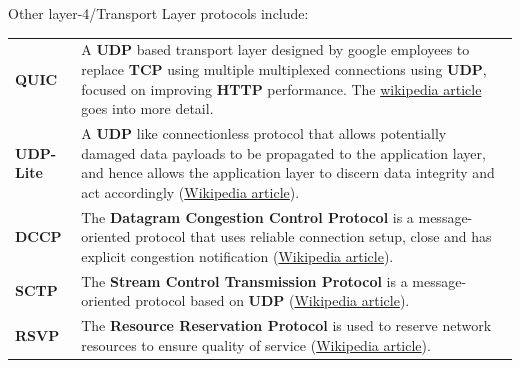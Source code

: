Other layer-4/Transport Layer protocols include:
\begin{center}
    \begin{tabular}{l p{}}
        \textbf{QUIC}     & A \textbf{UDP} based transport layer designed by google employees to replace \textbf{TCP} using multiple multiplexed connections using \textbf{UDP}, focused on improving \textbf{HTTP} performance. The \href{https://en.wikipedia.org/wiki/QUIC}{wikipedia article} goes into more detail.  \\
        \textbf{UDP-Lite} & A \textbf{UDP} like connectionless protocol that allows potentially damaged data payloads to be propagated to the application layer, and hence allows the application layer to discern data integrity and act accordingly (\href{https://en.wikipedia.org/wiki/UDP-Lite}{Wikipedia article}). \\
        \textbf{DCCP}     & The \textbf{Datagram Congestion Control Protocol} is a message-oriented protocol that uses reliable connection setup, close and has explicit congestion notification (\href{https://en.wikipedia.org/wiki/Datagram_Congestion_Control_Protocol}{Wikipedia article}).                          \\
        \textbf{SCTP}     & The \textbf{Stream Control Transmission Protocol} is a message-oriented protocol based on \textbf{UDP} (\href{https://en.wikipedia.org/wiki/Stream_Control_Transmission_Protocol}{Wikipedia article}).                                                                                        \\
        \textbf{RSVP}     & The \textbf{Resource Reservation Protocol} is used to reserve network resources to ensure quality of service (\href{https://en.wikipedia.org/wiki/Resource_Reservation_Protocol}{Wikipedia article}).                                                                                         \\
    \end{tabular}
\end{center}

